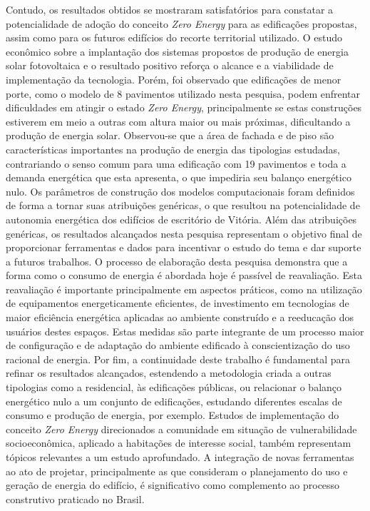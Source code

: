\noindent Contudo, os resultados obtidos se mostraram satisfatórios para constatar a potencialidade de adoção do conceito \textit{Zero Energy} para as edificações propostas, assim como para os futuros edifícios do recorte territorial utilizado. O estudo econômico sobre a implantação dos sistemas propostos de produção de energia solar fotovoltaica e o resultado positivo reforça o alcance e a viabilidade de implementação da tecnologia.\vspace*{0.3cm} \newline
\noindent Porém, foi observado que edificações de menor porte, como o modelo de 8 pavimentos utilizado nesta pesquisa, podem enfrentar dificuldades em atingir o estado \textit{Zero Energy}, principalmente se estas construções estiverem em meio a outras com altura maior ou mais próximas, dificultando a produção de energia solar. Observou-se que a área de fachada e de piso são características importantes na produção de energia das tipologias estudadas, contrariando o senso comum para uma edificação com 19 pavimentos e toda a demanda energética que esta apresenta, o que impediria seu balanço energético nulo.\vspace*{0.3cm} \newline
\noindent Os parâmetros de construção dos modelos computacionais foram definidos de forma a tornar suas atribuições genéricas, o que resultou na potencialidade de autonomia energética dos edifícios de escritório de Vitória. Além das atribuições genéricas, os resultados alcançados nesta pesquisa representam o objetivo final de proporcionar ferramentas e dados para incentivar o estudo do tema e dar suporte a futuros trabalhos.\vspace*{0.3cm} \newline
\noindent O processo de elaboração desta pesquisa demonstra que a forma como o consumo de energia é abordada hoje é passível de reavaliação. Esta reavaliação é importante principalmente em aspectos práticos, como na utilização de equipamentos energeticamente eficientes, de investimento em tecnologias de maior eficiência energética aplicadas ao ambiente construído e a reeducação dos usuários destes espaços. Estas medidas são parte integrante de um processo maior de configuração e de adaptação do ambiente edificado à conscientização do uso racional de energia.\vspace*{0.3cm} \newline
\noindent Por fim, a continuidade deste trabalho é fundamental para refinar os resultados alcançados, estendendo a metodologia criada a outras tipologias como a residencial, às edificações públicas, ou relacionar o balanço energético nulo a um conjunto de edificações, estudando diferentes escalas de consumo e produção de energia, por exemplo. Estudos de implementação do conceito \textit{Zero Energy} direcionados a comunidade em situação de vulnerabilidade socioeconômica, aplicado a habitações de interesse social, também representam tópicos relevantes a um estudo aprofundado. A integração de novas ferramentas ao ato de projetar, principalmente as que consideram o planejamento do uso e geração de energia do edifício, é significativo como complemento ao processo construtivo praticado no Brasil.\pagebreak
